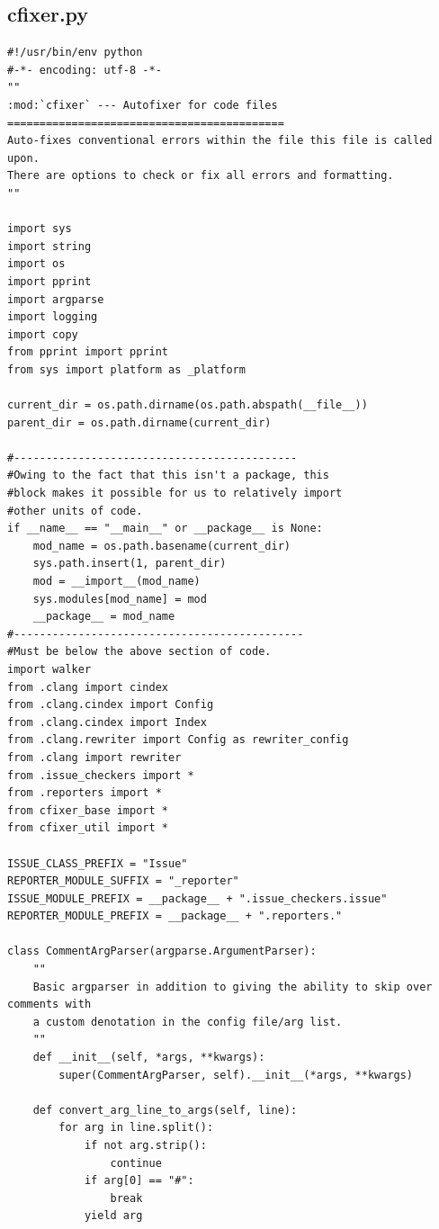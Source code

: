 \documentclass[11pt]{scrreprt}
\begin{document}
\subsection{cfixer.py}
\lstset{language=Python,breaklines=true}
\begin{lstlisting}[frame=single,basicstyle=\small]
#!/usr/bin/env python
#-*- encoding: utf-8 -*-
""
:mod:`cfixer` --- Autofixer for code files
===========================================
Auto-fixes conventional errors within the file this file is called upon.
There are options to check or fix all errors and formatting.
""

import sys
import string
import os
import pprint
import argparse
import logging
import copy
from pprint import pprint
from sys import platform as _platform

current_dir = os.path.dirname(os.path.abspath(__file__))
parent_dir = os.path.dirname(current_dir)

#--------------------------------------------
#Owing to the fact that this isn't a package, this
#block makes it possible for us to relatively import
#other units of code.
if __name__ == "__main__" or __package__ is None:
    mod_name = os.path.basename(current_dir)
    sys.path.insert(1, parent_dir)
    mod = __import__(mod_name)
    sys.modules[mod_name] = mod
    __package__ = mod_name
#---------------------------------------------
#Must be below the above section of code.
import walker
from .clang import cindex
from .clang.cindex import Config
from .clang.cindex import Index
from .clang.rewriter import Config as rewriter_config
from .clang import rewriter
from .issue_checkers import *
from .reporters import *
from cfixer_base import *
from cfixer_util import *

ISSUE_CLASS_PREFIX = "Issue"
REPORTER_MODULE_SUFFIX = "_reporter"
ISSUE_MODULE_PREFIX = __package__ + ".issue_checkers.issue"
REPORTER_MODULE_PREFIX = __package__ + ".reporters."

class CommentArgParser(argparse.ArgumentParser):
    ""
    Basic argparser in addition to giving the ability to skip over comments with
    a custom denotation in the config file/arg list.
    ""
    def __init__(self, *args, **kwargs):
        super(CommentArgParser, self).__init__(*args, **kwargs)

    def convert_arg_line_to_args(self, line):
        for arg in line.split():
            if not arg.strip():
                continue
            if arg[0] == "#":
                break
            yield arg



\end{lstlisting}
\end{document}
